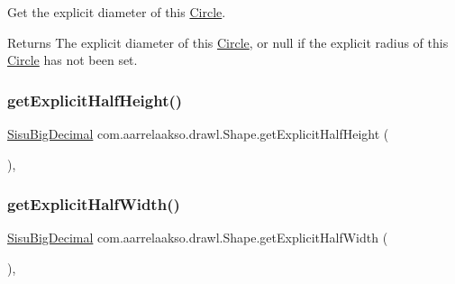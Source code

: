Get the explicit diameter of this \hyperlink{classcom_1_1aarrelaakso_1_1drawl_1_1_circle}{Circle}.

\begin{DoxyReturn}{Returns}
The explicit diameter of this \hyperlink{classcom_1_1aarrelaakso_1_1drawl_1_1_circle}{Circle}, or {\ttfamily null} if the explicit radius of this \hyperlink{classcom_1_1aarrelaakso_1_1drawl_1_1_circle}{Circle} has not been set. 
\end{DoxyReturn}
\mbox{\label{classcom_1_1aarrelaakso_1_1drawl_1_1_shape_aa3857406bc4f6c7373f1cd7cbe16dfd9}} 
\subsubsection{\texorpdfstring{get\+Explicit\+Half\+Height()}{getExplicitHalfHeight()}}
{\footnotesize\ttfamily \hyperlink{classcom_1_1aarrelaakso_1_1drawl_1_1_sisu_big_decimal}{Sisu\+Big\+Decimal} com.\+aarrelaakso.\+drawl.\+Shape.\+get\+Explicit\+Half\+Height (\begin{DoxyParamCaption}{ }\end{DoxyParamCaption})\hspace{0.3cm}{\ttfamily [protected]}, {\ttfamily [inherited]}}

\mbox{\label{classcom_1_1aarrelaakso_1_1drawl_1_1_shape_a4fba348eaeef3c258aa7443410137ad7}} 
\subsubsection{\texorpdfstring{get\+Explicit\+Half\+Width()}{getExplicitHalfWidth()}}
{\footnotesize\ttfamily \hyperlink{classcom_1_1aarrelaakso_1_1drawl_1_1_sisu_big_decimal}{Sisu\+Big\+Decimal} com.\+aarrelaakso.\+drawl.\+Shape.\+get\+Explicit\+Half\+Width (\begin{DoxyParamCaption}{ }\end{DoxyParamCaption})\hspace{0.3cm}{\ttfamily [protected]}, {\ttfamily [inherited]}}

